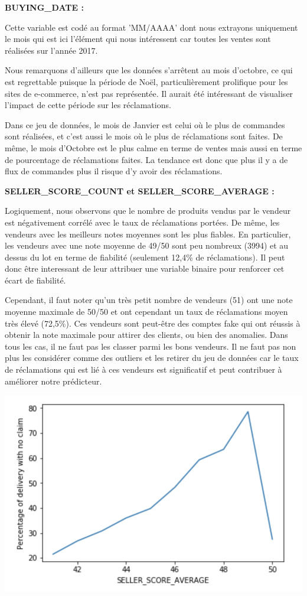 \textbf{BUYING_DATE :}

Cette variable est codé au format 'MM/AAAA' dont nous extrayons uniquement le mois qui est ici 
l'élément qui nous intéressent car toutes les ventes sont réalisées sur l'année 2017.

Nous remarquons d'ailleurs que les données s'arrêtent au mois d'octobre, ce qui est regrettable
puisque la période de Noël, particulièrement prolifique pour les sites de e-commerce, n'est 
pas représentée. Il aurait été intéressant de visualiser l'impact de cette période sur les
réclamations.

Dans ce jeu de données, le mois de Janvier est celui où le plus de commandes sont réalisées,
et c'est aussi le mois où le plus de réclamations sont faites. De même, le mois d'Octobre
est le plus calme en terme de ventes mais aussi en terme de pourcentage de réclamations
faites. La tendance est donc que plus il y a de flux de commandes plus il risque d'y avoir
des réclamations.

\textbf{SELLER_SCORE_COUNT et SELLER_SCORE_AVERAGE :}

Logiquement, nous observons que le nombre de produits vendus par le vendeur est négativement
corrélé avec le taux de réclamations portées. De même, les vendeurs avec les meilleurs
notes moyennes sont les plus fiables. En particulier, les vendeurs avec une note moyenne de
49/50 sont peu nombreux (3994) et au dessus du lot en terme de fiabilité (seulement 12,4\%
de réclamations). Il peut donc être interessant de leur attribuer une variable binaire pour 
renforcer cet écart de fiabilité.

Cependant, il faut noter qu'un très petit nombre de vendeurs (51) ont une note moyenne 
maximale de 50/50 et ont cependant un taux de réclamations moyen très élevé (72,5\%).
Ces vendeurs sont peut-être des comptes fake qui ont réussis à obtenir la note maximale
pour attirer des clients, ou bien des anomalies. Dans tous les cas, il ne faut pas les 
classer parmi les bons vendeurs. Il ne faut pas non plus les considérer comme des outliers
et les retirer du jeu de données car le taux de réclamations qui est lié à ces vendeurs est 
significatif et peut contribuer à améliorer notre prédicteur.

\begin{center}
\includegraphics[scale=0.5]{assets/sellerscore} 
\end{center}

